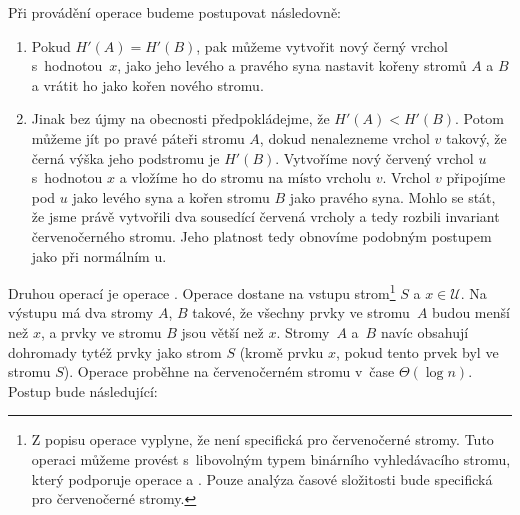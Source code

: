 Při provádění operace  budeme postupovat následovně:

\begin{enumerate}
\item Pokud $H'(A) = H'(B)$, pak můžeme vytvořit nový černý vrchol s~hodnotou~$x$, jako jeho levého a pravého syna nastavit kořeny stromů $A$ a $B$ a vrátit ho jako kořen nového stromu.
\item Jinak bez újmy na obecnosti předpokládejme, že $H'(A)<H'(B)$. Potom můžeme jít po pravé páteři stromu $A$, dokud nenalezneme vrchol $v$ takový, že černá výška jeho podstromu je $H'(B)$. Vytvoříme nový červený vrchol $u$ s~hodnotou $x$ a vložíme ho do stromu na místo vrcholu $v$. Vrchol $v$ připojíme pod $u$ jako levého syna a kořen stromu $B$ jako pravého syna. Mohlo se stát, že jsme právě vytvořili dva sousedící červená vrcholy a tedy rozbili invariant červenočerného stromu. Jeho platnost tedy obnovíme podobným postupem jako při normálním u.
\end{enumerate}

Druhou operací je operace . Operace  dostane na vstupu
strom\footnote{Z popisu operace  vyplyne, že není specifická pro
červenočerné stromy. Tuto operaci můžeme provést s~libovolným typem binárního
vyhledávacího stromu, který podporuje operace  a . Pouze
analýza časové složitosti bude specifická pro červenočerné stromy.} $S$ a $x\in
\mathcal U$. Na výstupu má dva stromy $A$, $B$ takové, že všechny prvky ve
stromu~$A$ budou menší než $x$, a prvky ve stromu $B$ jsou větší než $x$.
Stromy~$A$ a~$B$ navíc obsahují dohromady tytéž prvky jako strom $S$ (kromě
prvku $x$, pokud tento prvek byl ve stromu $S$). Operace  proběhne
na červenočerném stromu v~čase $\Theta(\log n)$. Postup bude následující:


